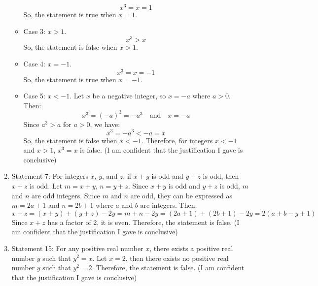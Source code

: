 \documentclass{article}
\begin{document}
\begin{enumerate}
\begin{itemize}
                    \[
                        x^3 = x = 1
                    \]
                    So, the statement is true when $x = 1$.
              \item Case 3: $x > 1$.
                    \[
                        x^3 > x
                    \]
                    So, the statement is false when $x > 1$.
              \item Case 4: $x = -1$.
                    \[
                        x^3 = x = -1
                    \]
                    So, the statement is true when $x = -1$.
              \item Case 5: $x < -1$.
                    Let \(x\) be a negative integer, so \(x = -a\) where \(a > 0\).
                    Then:
                    \[
                        x^3 = {(-a)}^3 = -a^3 \quad \text{and} \quad x = -a
                    \]
                    Since \(a^3 > a\) for \(a > 0\), we have:
                    \[
                        x^3 = -a^3 < -a = x
                    \]
                    So, the statement is false when $x < -1$.\newline
                    Therefore, for integers \(x < -1\) and \(x > 1\), \(x^3 = x\) is false.\newline
                    (I am confident that the justification I gave is conclusive)
          \end{itemize}
    \item Statement 7: For integers $x$, $y$, and $z$, if $x+y$ is odd and $y+z$ is odd, then $x+z$ is odd.\newline
          Let \(m = x + y\), \(n = y + z\). Since \(x + y\) is odd and \(y + z\) is odd, \(m\) and \(n\) are odd integers.\newline
          Since \(m\) and \(n\) are odd, they can be expressed as \(m = 2a + 1\) and \(n = 2b + 1\) where \(a\) and \(b\) are integers.\newline
          Then:
          \[
              x + z = (x + y) + (y + z) - 2y = m + n - 2y = (2a + 1) + (2b + 1) - 2y = 2(a + b - y + 1)
          \]
          Since \(x + z\) has a factor of 2, it is even.\newline
          Therefore, the statement is false.\newline
          (I am confident that the justification I gave is conclusive)
    \item Statement 15: For any positive real number $x$, there exists a positive real number $y$ such that $y^2 = x$.\newline
          Let \(x = 2\), then there exists no positive real number \(y\) such that \(y^2 = 2\).\newline
          Therefore, the statement is false.\newline
          (I am confident that the justification I gave is conclusive)
\end{enumerate}
\end{document}
